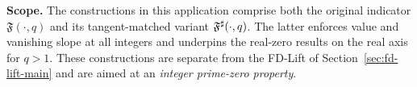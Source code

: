 \FloatBarrier


\noindent\textbf{Scope.} The constructions in this application comprise both the original indicator $\mathfrak F(\cdot,q)$ and its tangent-matched variant $\mathfrak F^{\sharp}(\cdot,q)$. The latter enforces value and vanishing slope at all integers and underpins the real-zero results on the real axis for $q>1$. These constructions are separate from the FD-Lift of Section~\ref{sec:fd-lift-main} and are aimed at an \emph{integer prime-zero property}.

